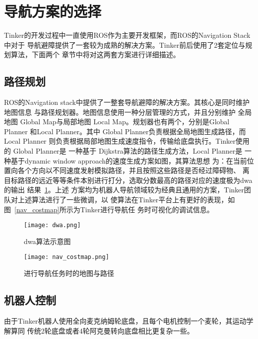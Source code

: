 \section{导航方案的选择}

Tinker的开发过程中一直使用ROS作为主要开发框架，而ROS的Navigation Stack中对于
导航避障提供了一套较为成熟的解决方案。Tinker前后使用了2套定位与规划算法，下面两个
章节中将对这两套方案进行详细描述。

\subsection{路径规划}

ROS的Navigation stack中提供了一整套导航避障的解决方案。其核心是同时维护地图信息
与路径规划器。地图信息使用一种分层管理的方式\cite{lu2014layered}，并且分别维护
全局地图 Global Map与局部地图 Local Map。规划器也有两个，分别是Global Planner
和Local Planner。其中 Global Planner负责根据全局地图生成路径，而 Local Planner
则负责根据局部地图生成速度指令，传输给底盘执行。Tinker使用的 Global Planner是
一种基于 Dijkstra算法\cite{deng2012fuzzy}的路径生成方法，Local Planner是
一种基于dynamic window approach的速度生成方案\cite{fox1997dynamic}如图，其算法思想
为：在当前位置向各个方向以不同速度发射模拟路径，并且按照这些路径是否经过障碍物、
离目标路径的远近等等条件本别进行打分，选取分数最高的路径对应的速度极为dwa的输出
结果~\ref{fig:dwa}。上述
方案均为机器人导航领域较为经典且通用的方案，Tinker团队对上述算法进行了一些微调，以
使算法在Tinker平台上有更好的表现，如图~\ref{nav_costmap}所示为Tinker进行导航任
务时可视化的调试信息。


\begin{figure}[h] %
  \centering
  \texttt{[image: dwa.png]}
  \caption{dwa算法示意图}
  \label{fig:dwa}
\end{figure}


\begin{figure}[h] %
  \centering
  \texttt{[image: nav\_costmap.png]}
  \caption{进行导航任务时的地图与路径}
  \label{fig:nav_costmap}
\end{figure}

\subsection{机器人控制}

由于Tinker机器人使用全向麦克纳姆轮底盘，且每个电机控制一个麦轮，其运动学解算同
传统2轮底盘或者4轮阿克曼转向底盘相比更复杂一些。


